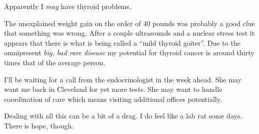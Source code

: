 Apparently I \emph{may} have thyroid problems.

The unexplained weight gain on the order of 40 pounds was probably a
good clue that something was wrong. After a couple ultrasounds and a
nuclear stress test it appears that there is what is being called a
``mild thyroid goiter''. Due to the omnipresent \emph{big, bad rare
disease} my potential for thyroid cancer is around thirty times that of
the average person.

I'll be waiting for a call from the endocrinologist in the week ahead.
She may want me back in Cleveland for yet more tests. She may want to
handle coordination of care which means visiting additional offices
potentially.

Dealing with all this can be a bit of a drag. I do feel like a lab rat
some days. There is hope, though.
